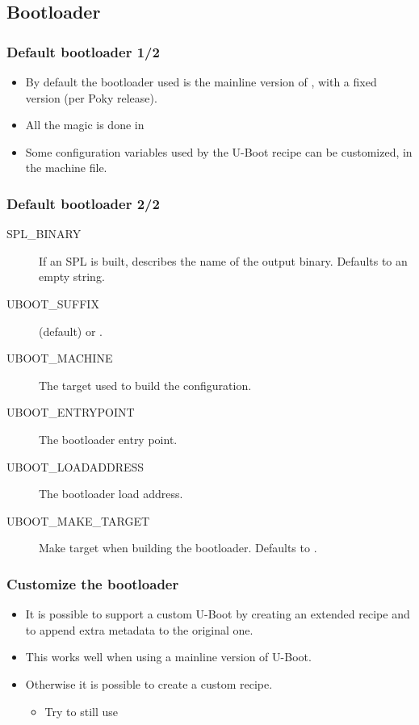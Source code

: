 \subsection{Bootloader}

\begin{frame}
  \frametitle{Default bootloader 1/2}
  \begin{itemize}
    \item By default the bootloader used is the mainline version of
      , with a fixed version (per Poky release).
    \item All the magic is done in
    \item Some configuration variables used by the U-Boot recipe can
      be customized, in the machine file.
  \end{itemize}
\end{frame}

\begin{frame}
  \frametitle{Default bootloader 2/2}
  \begin{description}
    \item[SPL\_BINARY] If an SPL is built, describes the name of the
      output binary. Defaults to an empty string.
    \item[UBOOT\_SUFFIX]  (default) or .
    \item[UBOOT\_MACHINE] The target used to build the configuration.
    \item[UBOOT\_ENTRYPOINT] The bootloader entry point.
    \item[UBOOT\_LOADADDRESS] The bootloader load address.
    \item[UBOOT\_MAKE\_TARGET] Make target when building the
      bootloader.  Defaults to .
  \end{description}
\end{frame}

\begin{frame}
  \frametitle{Customize the bootloader}
  \begin{itemize}
    \item It is possible to support a custom U-Boot by creating an
      extended recipe and to append extra metadata to the original
      one.
    \item This works well when using a mainline version of U-Boot.
    \item Otherwise it is possible to create a custom recipe.
      \begin{itemize}
        \item Try to still use
      \end{itemize}
  \end{itemize}
\end{frame}

